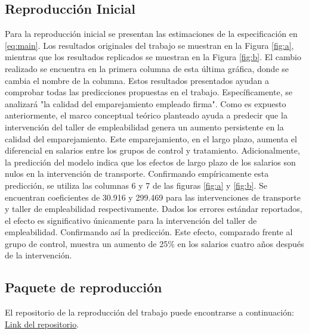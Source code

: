 \documentclass{article}
\begin{document}
    \subsection{Reproducción Inicial}
    Para la reproducción inicial se presentan las estimaciones de la especificación en \ref{eq:main}. Los resultados originales del trabajo se muestran en la Figura \ref{fig:a}, mientras que los resultados replicados se muestran en la Figura \ref{fig:b}. El cambio realizado se encuentra en la primera columna de esta última gráfica, donde se cambia el nombre de la columna. Estos resultados presentados ayudan a comprobar todas las predicciones propuestas en el trabajo. Específicamente, se analizará "la calidad del emparejamiento empleado firma". Como es expuesto anteriormente, el marco conceptual teórico planteado ayuda a predecir que la intervención del taller de empleabilidad genera un aumento persistente en la calidad del emparejamiento. Este emparejamiento, en el largo plazo, aumenta el diferencial en salarios entre los grupos de control y tratamiento. Adicionalmente, la predicción del modelo indica que los efectos de largo plazo de los salarios son nulos en la intervención de transporte. Confirmando empíricamente esta predicción, se utiliza las columnas 6 y 7 de las figuras \ref{fig:a} y \ref{fig:b}. Se encuentran coeficientes de 30.916 y 299.469 para las intervenciones de transporte y taller de empleabilidad respectivamente. Dados los errores estándar reportados, el efecto es significativo únicamente para la intervención del taller de empleabilidad. Confirmando así la predicción. Este efecto, comparado frente al grupo de control, muestra un aumento de 25\% en los salarios cuatro años después de la intervención.
    
    \begin{figure}
        \centering
        \qquad
    \end{figure}
    
    \subsection{Paquete de reproducción}
    
    El repositorio de la reproducción del trabajo puede encontrarse a continuación:  \href{https://github.com/jorgeluis8ar/Revised-reproduction-package-for-Abebe-et-al-2021}{Link del repositorio}.
    
\newpage


\end{document}
